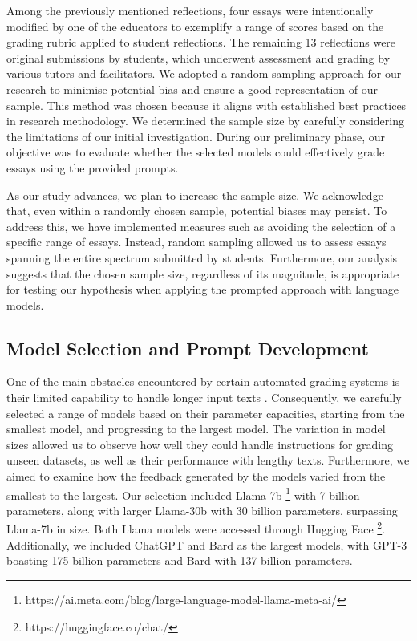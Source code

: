 \documentclass{article}
\begin{document}
Among the previously mentioned reflections, four essays were intentionally modified by one of the educators to exemplify a range of scores based on the grading rubric applied to student reflections. The remaining 13 reflections were original submissions by students, which underwent assessment and grading by various tutors and facilitators. We adopted a random sampling approach for our research to minimise potential bias and ensure a good representation of our sample. This method was chosen because it aligns with established best practices in research methodology. We determined the sample size by carefully considering the limitations of our initial investigation. During our preliminary phase, our objective was to evaluate whether the selected models could effectively grade essays using the provided prompts. 

As our study advances, we plan to increase the sample size. We acknowledge that, even within a randomly chosen sample, potential biases may persist. To address this, we have implemented measures such as avoiding the selection of a specific range of essays. Instead, random sampling allowed us to assess essays spanning the entire spectrum submitted by students. Furthermore, our analysis suggests that the chosen sample size, regardless of its magnitude, is appropriate for testing our hypothesis when applying the prompted approach with language models.

\subsection {Model Selection and Prompt Development}

One of the main obstacles encountered by certain automated grading systems is their limited capability to handle longer input texts \cite{zhang2022automatic}. Consequently, we carefully selected a range of models based on their parameter capacities, starting from the smallest model, and progressing to the largest model. The variation in model sizes allowed us to observe how well they could handle instructions for grading unseen datasets, as well as their performance with lengthy texts. Furthermore, we aimed to examine how the feedback generated by the models varied from the smallest to the largest. Our selection included Llama-7b 
\footnote{https://ai.meta.com/blog/large-language-model-llama-meta-ai/} with 7 billion parameters, along with larger Llama-30b with 30 billion parameters, surpassing Llama-7b in size. Both Llama models were accessed through Hugging Face \footnote{https://huggingface.co/chat/}. Additionally, we included ChatGPT \footnotemark[1] and Bard \footnotemark[2] as the largest models, with GPT-3 boasting 175 billion parameters and Bard with  137 billion parameters.
\end{document}
